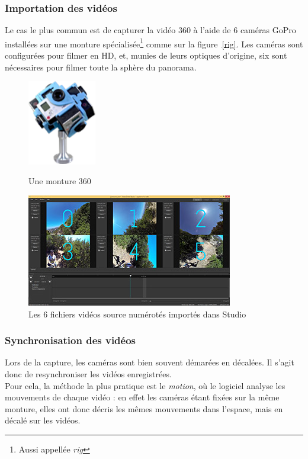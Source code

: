 \subsubsection{Importation des vidéos}
Le cas le plus commun est de capturer la vidéo 360 à l'aide de 6 caméras GoPro 
installées sur une monture spécialisée\footnote{Aussi appellée \textit{rig}} comme sur la figure~\ref{rig}. 
Les caméras sont configurées pour filmer en HD, et, munies de leurs optiques 
d'origine, six sont nécessaires pour filmer toute la sphère du panorama.
\begin{figure}
  \centering
  \begin{minipage}[b]{0.3\textwidth}
    \centering
    \includegraphics[width=3cm]{images/rig.png}
    \caption{Une monture 360}
    \label{rig}
  \end{minipage}%
  \hspace{0.04\textwidth}
  \begin{minipage}[b]{0.65\textwidth}
    \centering
    \includegraphics[width=9cm]{images/studio-sources-numeros.jpg}
    \caption{Les 6 fichiers vidéos source numérotés importés dans Studio}
    \label{importation}
  \end{minipage}
\end{figure}

\subsubsection{Synchronisation des vidéos}
Lors de la capture, les caméras sont bien souvent démarées en décalées. Il s'agit
donc de resynchroniser les vidéos enregistrées.\\
Pour cela, la méthode la plus pratique est le \textit{motion},
où le logiciel analyse les mouvements de chaque vidéo : en effet les caméras étant fixées
sur la même monture, elles ont donc décris les mêmes mouvements dans l'espace, mais 
en décalé sur les vidéos.

